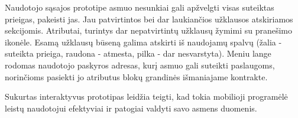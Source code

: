 Naudotojo sąsajos prototipe asmuo nesunkiai gali apžvelgti visas suteiktas prieigas, pakeisti jas. Jau patvirtintos bei
dar laukiančios užklausos atskiriamos sekcijomis. Atributai, turintys dar nepatvirtintų užklausų žymimi su pranešimo ikonėle.
Esamą užklausų būseną galima atskirti iš naudojamų spalvų (žalia - suteikta
prieiga, raudona - atmesta, pilka - dar nesvarstyta). Meniu lange rodomas naudotojo paskyros adresas, kurį asmuo gali suteikti paslaugoms, norinčioms pasiekti jo atributus blokų grandinės
išmaniajame kontrakte.

Sukurtas interaktyvus prototipas leidžia teigti, kad tokia mobilioji programėlė leistų naudotojui efektyviai ir patogiai valdyti savo
asmens duomenis.